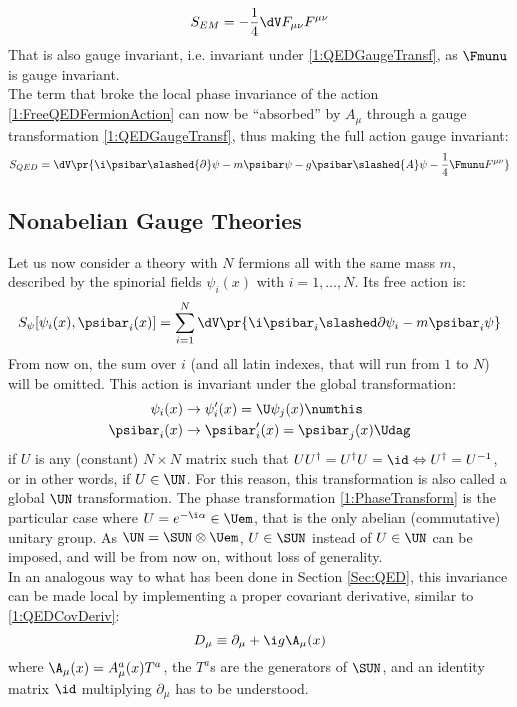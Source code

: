 \begin{equation}
    S_{EM} = -\frac14\dV F_{\mu\nu}F^{\mu\nu} \label{1:FreeMaxwellAction}
\end{equation}
That is also gauge invariant, i.e. invariant under \eqref{1:QEDGaugeTransf}, as $\Fmunu$ is gauge invariant.\\
The term that broke the local phase invariance of the action \eqref{1:FreeQEDFermionAction} can now be ``absorbed'' by $A_\mu$ through a gauge transformation \eqref{1:QEDGaugeTransf}, thus making the full action gauge invariant:
\begin{equation}
    S_{QED} = \dV\pr{\i\psibar\slashed{\partial}\psi-m\psibar\psi- g \psibar\slashed{A}\psi - \frac14\Fmunu F^{\mu\nu}} \label{1:QEDaction}
\end{equation}

\subsection{Nonabelian Gauge Theories}
Let us now consider a theory with $N$ fermions all with the same mass $m$, described by the spinorial fields $\psi_i(x)$ with $i=1, \dots, N$. Its free action is:
\begin{equation}
    S_\psi[\psi_i(x),\psibar_i(x)] = \sum_{i=1}^N\dV\pr{\i\psibar_i\slashed\partial\psi_i - m\psibar_i\psi} \label{1:FreeFermionAction}
\end{equation}
From now on, the sum over $i$ (and all latin indexes, that will run from $1$ to $N$) will be omitted.
This action is invariant under the global transformation:
\begin{align*}
    \psi_i(x) &\rightarrow \psi_i'(x) = \U\psi_j(x) \numthis\label{1:UNTransform}\\
    \psibar_i(x) &\rightarrow \psibar_i'(x) = \psibar_j(x)\Udag
\end{align*}
if $U$ is any (constant) $N\times N$ matrix such that $UU^\dagger = U^\dagger U = \id \Leftrightarrow U^\dagger=U^{-1}$, or in other words, if $U\in\UN$.
For this reason, this transformation is also called a global $\UN$ transformation.
The phase transformation \eqref{1:PhaseTransform} is the particular case where $U=e^{-\i\alpha}\in\Uem$, that is the only abelian (commutative) unitary group.
As $\UN = \SUN\otimes\Uem$, $U\in\SUN$ instead of $U\in\UN$ can be imposed, and will be from now on, without loss of generality.\\
In an analogous way to what has been done in Section \ref{Sec:QED}, this invariance can be made local by implementing a proper covariant derivative, similar to \eqref{1:QEDCovDeriv}:
\begin{equation}
    D_\mu \equiv \partial_\mu + \i g \A_\mu(x) \label{1:CovDeriv}
\end{equation}
where $\A_\mu(x) = A_\mu^a(x)T^a$, the $T^a$s are the generators of $\SUN$, and an identity matrix $\id$ multiplying $\partial_\mu$ has to be understood.
